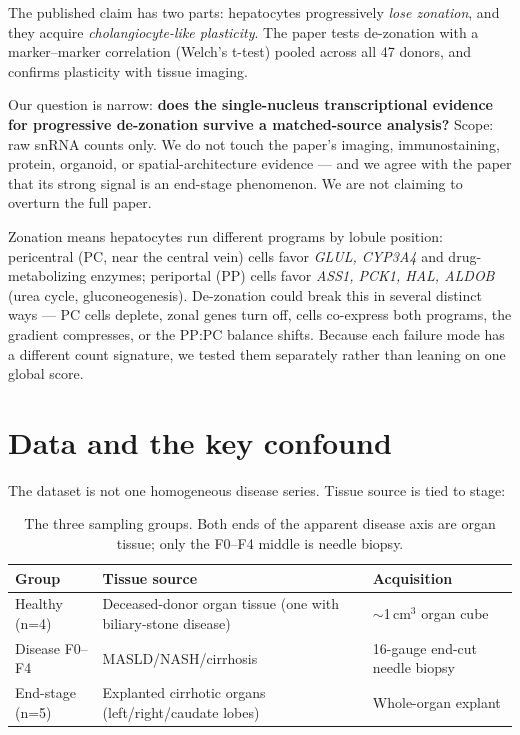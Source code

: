 \documentclass[11pt,a4paper]{article}
\begin{document}
The published claim has two parts: hepatocytes progressively \emph{lose zonation}, and they acquire \emph{cholangiocyte-like plasticity}. The paper tests de-zonation with a marker--marker correlation (Welch's t-test) pooled across all 47 donors, and confirms plasticity with tissue imaging.

Our question is narrow: \textbf{does the single-nucleus transcriptional evidence for progressive de-zonation survive a matched-source analysis?} Scope: raw snRNA counts only. We do not touch the paper's imaging, immunostaining, protein, organoid, or spatial-architecture evidence --- and we agree with the paper that its strong signal is an end-stage phenomenon. We are not claiming to overturn the full paper.

Zonation means hepatocytes run different programs by lobule position: pericentral (PC, near the central vein) cells favor \emph{GLUL, CYP3A4} and drug-metabolizing enzymes; periportal (PP) cells favor \emph{ASS1, PCK1, HAL, ALDOB} (urea cycle, gluconeogenesis). De-zonation could break this in several distinct ways --- PC cells deplete, zonal genes turn off, cells co-express both programs, the gradient compresses, or the PP:PC balance shifts. Because each failure mode has a different count signature, we tested them separately rather than leaning on one global score.

\section{Data and the key confound}

The dataset is not one homogeneous disease series. Tissue source is tied to stage:

\begin{table}[h]
\centering
\small
\begin{tabular}{lll}
\toprule
Group & Tissue source & Acquisition \\
\midrule
Healthy (n=4) & Deceased-donor organ tissue (one with biliary-stone disease) & $\sim$1\,cm$^3$ organ cube \\
Disease F0--F4 & MASLD/NASH/cirrhosis & 16-gauge end-cut needle biopsy \\
End-stage (n=5) & Explanted cirrhotic organs (left/right/caudate lobes) & Whole-organ explant \\
\bottomrule
\end{tabular}
\caption{The three sampling groups. Both ends of the apparent disease axis are organ tissue; only the F0--F4 middle is needle biopsy.}
\label{tab:groups}
\end{table}
\end{document}
